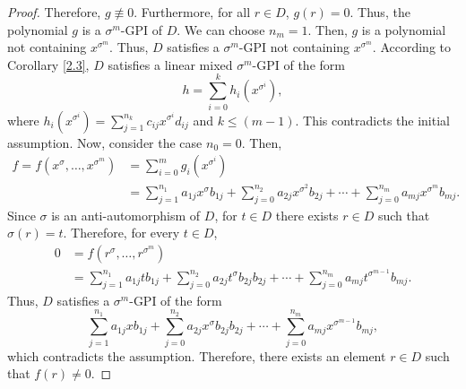 \documentclass{cimart}
\begin{document}
\begin{proof}
	Therefore, $ g\not\equiv 0$. Furthermore, for all $r\in D$, $g(r)=0$. Thus, the polynomial $g $ is a $\sigma^m$-GPI of $D$. We can choose $n_m=1$. Then, $g$ is a polynomial not containing $x^{\sigma^m}$. Thus, $D$ satisfies a $\sigma^m$-GPI not containing $x^{\sigma^m}$. According to Corollary \ref{2.3}, $D$ satisfies a linear mixed $\sigma^m$-GPI of the form
	$$h=\sum_{i=0}^{k} h_i(x^{\sigma^i}), $$
	where $h_i(x^{\sigma^i})=\sum_{j=1}^{n_k} c_{ij}x^{\sigma^i} d_{ij}$ and $k\leq (m-1)$. This contradicts the initial assumption. Now, consider the case $n_0=0$. Then,
	\begin{align*}
	f=f( x^{\sigma}, \dots, x^{\sigma^m} )&=\sum_{i=0}^{m}g_i(x^{\sigma^i})\\
	&= \sum_{j=1}^{n_1} a_{1j}x^{\sigma}b_{1j}+ \sum_{j=0}^{n_2}a_{2j}x^{\sigma^2}b_{2j}+\cdots +\sum_{j=0}^{n_m}a_{mj}x^{\sigma^m}b_{mj}.
	\end{align*}
	Since $\sigma $ is an {anti-automorphism} of $D$, for $t\in D$ there exists $r\in D$ such that $\sigma(r)=t$. Therefore, for every $t\in D $, 
	\begin{align*}
	0&=f(   r^{\sigma}, \dots, r^{\sigma^{m}})\\
	&=\sum_{j=1}^{n_1} a_{1j}tb_{1j}+ \sum_{j=0}^{n_2}a_{2j}t^{\sigma}b_{2j}b_{2j}+\cdots +\sum_{j=0}^{n_m}a_{mj}t^{\sigma^{m-1}}b_{mj}.
	\end{align*}
	Thus, $D$ satisfies a $\sigma^m$-GPI of the form 
	$$\sum_{j=1}^{n_1} a_{1j}xb_{1j}+ \sum_{j=0}^{n_2}a_{2j}x^{\sigma}b_{2j}b_{2j}+\cdots +\sum_{j=0}^{n_m}a_{mj}x^{\sigma^{m-1}}b_{mj},	$$ 
	which contradicts the assumption. Therefore, there exists an element $r\in D$ such that $f(r)\neq 0$.
\end{proof}
\end{document}
